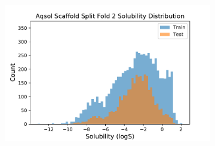 \documentclass[journal=jcisd8,manuscript=article]{achemso}
\begin{document}
\begin{figure}[tb]
    \begin{subfigure}[t]{0.48\textwidth}
        \centering
        \includegraphics[width=\linewidth]{figures/aqsol_scaf2_soldist.pdf}
    \end{subfigure}
    

\end{figure}
\end{document}
